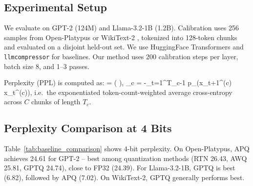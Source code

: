 \documentclass[10pt,twocolumn,letterpaper]{article}
\let\oldequation\equation
\let\oldendequation\endequation
\renewenvironment{equation}{\oldequation\small}{\oldendequation}
\begin{document}
\subsection{Experimental Setup}

We evaluate on GPT-2 (124M) and Llama-3.2-1B (1.2B). Calibration uses 256 samples from Open-Platypus \cite{openplatypus} or WikiText-2 \cite{wikitext}, tokenized into 128-token chunks and evaluated on a disjoint held-out set. We use HuggingFace Transformers \cite{huggingface} and \texttt{llmcompressor} \cite{llmcompressor} for baselines. Our method uses 200 calibration steps per layer, batch size 8, and 1--3 passes.

Perplexity (PPL) \cite{wikitext} is computed as:
\begin{equation}
 = \exp\left(  \right),
\end{equation}
\begin{equation}
_c = -\sum_{t=1}^{T_c-1} \log p_\theta\!\left(x_{t+1}^{(c)} \mid x_{\le t}^{(c)}\right),
\end{equation}
i.e.\ the exponentiated token-count-weighted average cross-entropy across $C$ chunks of length $T_c$.

\subsection{Perplexity Comparison at 4 Bits}

Table~\ref{tab:baseline_comparison} shows 4-bit perplexity. On Open-Platypus, APQ achieves 24.61 for GPT-2 -- best among quantization methods (RTN 26.43, AWQ 25.81, GPTQ 24.74), close to FP32 (24.39). For Llama-3.2-1B, GPTQ is best (6.82), followed by APQ (7.02). On WikiText-2, GPTQ generally performs best.

\begin{table}[h]
\centering
\caption{Perplexity at 4-bit quantization}
\label{tab:baseline_comparison}
\small
{}
\end{table}
\end{document}
